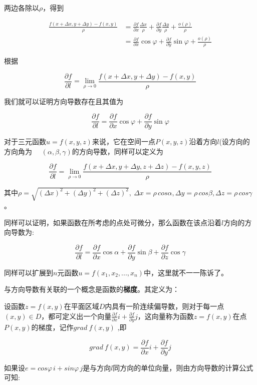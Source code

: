 \documentclass[]{book}
\begin{document}
两边各除以\(\rho\)，得到

\[
\begin{aligned}
\frac{f(x+\Delta x,y+\Delta y)-f(x,y)}{\rho} & = \frac{\partial f}{\partial x}\frac{\Delta x}{\rho}+\frac{\partial f}{\partial y} \frac{\Delta y}{\rho}+\frac{o(\rho)}{\rho} \\
&=\frac{\partial f}{\partial x}\cos\!\varphi +\frac{\partial f}{\partial y}\sin\!\varphi+\frac{o(\rho)}{\rho} 
\end{aligned}
\]

根据

\[
\frac{\partial f}{\partial l}=
\lim_{\rho \to 0}{\frac{f(x+\Delta x,y+\Delta y)-f(x,y)}{\rho}}
\]

我们就可以证明方向导数存在且其值为

\[
\frac{\partial f}{\partial l}=
\frac{\partial f}{\partial x}\cos \! \varphi +\frac{\partial f}{\partial y}\sin\!\varphi
\]

对于三元函数\(u=f(x,y,z)\)来说，它在空间一点\(P(x,y,z)\)沿着方向\(l\)(设方向的方向角为
　\((\alpha,\beta,\gamma)\)的方向导数，同样可以定义为

\[
\frac{\partial f}{\partial {l}}=
\lim_{\rho \to 0}{\frac{f(x+\Delta x,y+\Delta y,z + \Delta z)-f(x,y,z)}{\rho}}
\]

其中\(\rho =\sqrt{(\Delta x)^{2}+(\Delta y)^{2}+(\Delta z)^2},\ \Delta x=\rho \, cos\alpha,\Delta y=\rho \, cos\beta,\Delta z=\rho \, cos\gamma\)。

同样可以证明，如果函数在所考虑的点处可微分，那么函数在该点沿着\(l\)方向的方向导数为:

\[
\frac{\partial f}{\partial l}=
\frac{\partial f}{\partial x} \cos\!\alpha+\frac{\partial f}{\partial y} \sin\!\beta+\frac{\partial f}{\partial z} \cos \!\gamma
\]

同样可以扩展到\(n\)元函数\(u=f(x_1,x_2,...,x_n)\)中，这里就不一一陈诉了。

与方向导数有关联的一个概念是函数的\textbf{梯度}。其定义为：

设函数\(z=f(x,y)\)在平面区域\(D\)内具有一阶连续偏导数，则对于每一点\((x,y)\in D\)，都可定义出一个向量\(\frac{\partial f}{\partial {x}}i+\frac{\partial f}{\partial {y}}j\)，这向量称为函数\(z=f(x,y)\)在点\(P(x,y)\)的梯度，记作\(grad\ f(x,y)\) ,即

\[
grad\ f(x,y)=\frac{\partial f}{\partial {x}}i+\frac{\partial f}{\partial {y}}j
\]

如果设\(e=cos \varphi \,i+sin \varphi \,j\)是与方向\(l\)同方向的单位向量，则由方向导数的计算公式可知:
\end{document}
